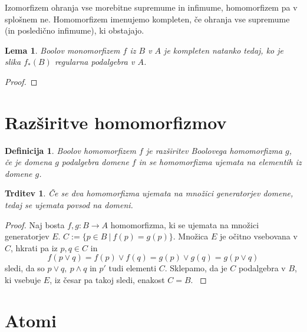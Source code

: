 \documentclass{amsart}
\newtheorem{lema}[izrek]{Lema}
\newtheorem{trditev}[izrek]{Trditev}
\newtheorem{definicija}[izrek]{Definicija}
\begin{document}
Izomorfizem ohranja vse morebitne supremume in infimume, homomorfizem pa 
v splošnem ne. Homomorfizem imenujemo kompleten, če ohranja vse supremume (in posledično infimume), ki obstajajo.

\begin{lema}
    Boolov monomorfizem $f$ iz $B$ v $A$ je kompleten natanko tedaj, ko 
    je slika \(f_{*}(B)\) regularna podalgebra v $A$.
\end{lema}

\begin{proof}
    
\end{proof}

\section{Razširitve homomorfizmov}

\begin{definicija}
    Boolov homomorfizem $f$ je razširitev Boolovega homomorfizma $g$, če je 
    domena $g$ podalgebra domene $f$ in se homomorfizma ujemata na elementih iz domene $g$.
\end{definicija}


\begin{trditev}
    Če se dva homomorfizma ujemata na množici generatorjev domene, tedaj se ujemata povsod na domeni.
\end{trditev}

\begin{proof}
    Naj bosta \(f,g : B \to A\) homomorfizma, ki se ujemata na množici generatorjev $E$.
    \(C := \{p \in B~|~ f(p) = g (p)\}\). Množica $E$ je očitno vsebovana v
    $C$, hkrati pa iz \(p,q \in C\) in 
    \[f(p \vee q) = f(p) \vee f(q) = g(p) \vee g(q) = g(p\vee q)\]
    sledi, da so \(p \vee q,~ p \wedge q\) in \(p'\) tudi elementi $C$.
    Sklepamo, da je $C$ podalgebra v $B$, ki vsebuje $E$, iz česar pa takoj sledi, 
    enakost \(C = B\).
    \label{enolicno}
\end{proof}

\section{Atomi}
\end{document}
